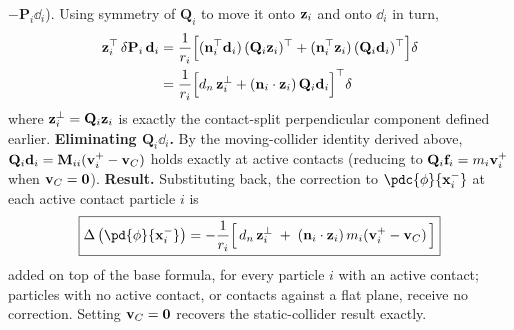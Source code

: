 \begin{derivation}
$-\mathbf{P}_i\dd_i$). Using symmetry of $\mathbf{Q}_i$ to move it onto $\mathbf{z}_i$ and onto $\dd_i$ in turn,
\begin{align*}
\mathbf{z}_i^\top\,\delta\mathbf{P}_i\,\mathbf{d}_i
&= \frac1{r_i}\Big[(\mathbf{n}_i^\top\mathbf{d}_i)\,(\mathbf{Q}_i\mathbf{z}_i)^\top + (\mathbf{n}_i^\top\mathbf{z}_i)\,(\mathbf{Q}_i\mathbf{d}_i)^\top\Big]\delta \\
&= \frac1{r_i}\Big[d_n\,\mathbf{z}_i^\perp + (\mathbf{n}_i\cdot\mathbf{z}_i)\,\mathbf{Q}_i\mathbf{d}_i\Big]^\top\delta
\end{align*}
where $\mathbf{z}_i^\perp = \mathbf{Q}_i\mathbf{z}_i$ is exactly the contact-split perpendicular component defined
earlier.
\newline \textbf{Eliminating $\mathbf{Q}_i\dd_i$.} By the moving-collider identity derived above,
$\mathbf{Q}_i\mathbf{d}_i = \mathbf{M}_{ii}(\mathbf{v}_i^+-\mathbf{v}_C)$ holds exactly at active contacts (reducing to
$\mathbf{Q}_i\mathbf{f}_i = m_i\mathbf{v}_i^+$ when $\mathbf{v}_C=\mathbf{0}$).
\newline \textbf{Result.} Substituting back, the correction to $\pdc{\phi}{\x_i^-}$ at each active
contact particle $i$ is
\begin{equation}
    \boxed{
    \Delta\left(\pd{\phi}{\x_i^-}\right)
    = -\frac1{r_i}\Big[\,d_n\,\z_i^\perp \;+\; (\n_i\cdot\z_i)\,m_i(\vv_i^+-\vv_C)\,\Big]
    }
\end{equation}
added on top of the base formula, for every particle $i$ with an active contact; particles
with no active contact, or contacts against a flat plane, receive no correction. Setting
$\mathbf{v}_C=\mathbf{0}$ recovers the static-collider result exactly.
\end{derivation}

